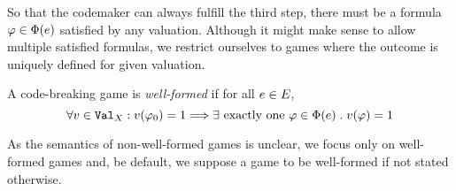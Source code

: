 So that the codemaker can always fulfill the third step,
  there must be a formula $\varphi\in\Phi(e)$ satisfied by any valuation.
Although it might make sense to allow multiple satisfied formulas, we restrict
  ourselves to games where the outcome is uniquely defined for given valuation.

\begin{definition} \label{def-wellformed}
A code-breaking game is \emph{well-formed} if for all $e \in E$,
\begin{equation}
\forall v\in\mathtt{Val}_X:
  v(\varphi_0) = 1 ==> \exists \textrm{ exactly one }
     \varphi\in\Phi(e)\;.\; v(\varphi) = 1
\end{equation}
\end{definition}

As the semantics of non-well-formed games is unclear,
  we focus only on well-formed games and, be default,
  we suppose a game to be well-formed if not stated otherwise.


